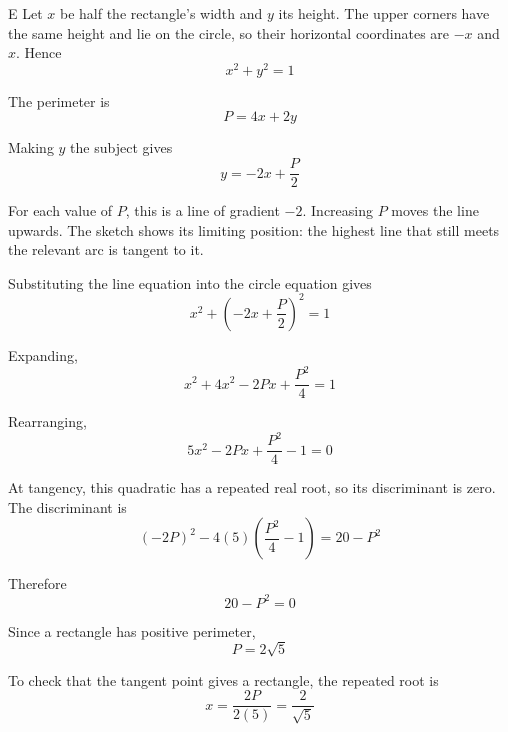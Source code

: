 \documentclass[11pt,a4paper]{article}
\begin{document}
\begin{enumerate}[label=\textbf{\arabic*.},leftmargin=*,itemsep=0pt,start=9]
\begin{djsSolution}{E}
Let $x$ be half the rectangle's width and $y$ its height. The upper corners have the same height and lie on the circle, so their horizontal coordinates are $-x$ and $x$. Hence
\[
x^2+y^2=1
\]

The perimeter is
\[
P=4x+2y
\]

Making $y$ the subject gives
\[
y=-2x+\frac{P}{2}
\]

For each value of $P$, this is a line of gradient $-2$. Increasing $P$ moves the line upwards. 
The sketch shows its limiting position: the highest line that still meets the relevant arc is tangent to it.

\begin{djsSolutionFigure}
\end{djsSolutionFigure}

Substituting the line equation into the circle equation gives
\[
x^2+\left(-2x+\frac{P}{2}\right)^2=1
\]

Expanding,
\[
x^2+4x^2-2Px+\frac{P^2}{4}=1
\]

Rearranging,
\[
5x^2-2Px+\frac{P^2}{4}-1=0
\]

At tangency, this quadratic has a repeated real root, so its discriminant is zero. The discriminant is
\[
(-2P)^2-4(5)\left(\frac{P^2}{4}-1\right)=20-P^2
\]

Therefore
\[
20-P^2=0
\]

Since a rectangle has positive perimeter,
\[
P=2\sqrt5
\]

To check that the tangent point gives a rectangle, the repeated root is
\[
x=\frac{2P}{2(5)}=\frac{2}{\sqrt5}
\]


\end{djsSolution}
\end{enumerate}
\end{document}
